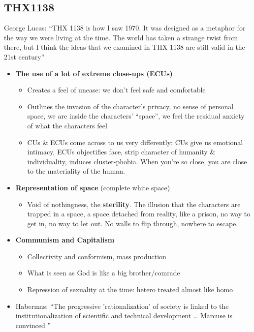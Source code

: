 \documentclass[11pt,fleqn]{book}
\begin{document}
\subsection{THX1138}
George Lucas: \enquote{THX 1138 is how I saw 1970. It was
designed as a metaphor for the
way we were living at the time. The
world has taken a strange twist
from there, but I think the ideas
that we examined in THX 1138 are
still valid in the 21st century}
\begin{itemize}
    \item \textbf{The use of a lot of extreme close-ups (ECUs)}
    \begin{itemize}
        \item Creates a feel of unease: we don't feel safe and comfortable
        \item Outlines the invasion of the character's privacy, no sense of personal space, we are inside the characters' \enquote{space}, we feel the residual anxiety of what the characters feel
        \item CUs \& ECUs come across to us very differently: CUs give us emotional intimacy, ECUs objectifies face, strip character of humanity \& individuality, induces cluster-phobia. When you're so close, you are close to the materiality of the human.
    \end{itemize}
    \item \textbf{Representation of space} (complete white space)
    \begin{itemize}
        \item Void of nothingness, the \textbf{sterility}. The illusion that the characters are trapped in a space, a space detached from reality, like a prison, no way to get in, no way to let out. No walls to flip through, nowhere to escape. 
    \end{itemize}
    \item \textbf{Communism and Capitalism}
    \begin{itemize}
        \item Collectivity and conformism, mass production
        \item What is seen as God is like a big brother/comrade
        \item Repression of sexuality at the time: hetero treated almost like homo
    \end{itemize}
    \item Habermas: \enquote{The progressive 'rationalization' of society is
linked to the institutionalization of scientific and
technical development … Marcuse is convinced
}
\end{itemize}
\end{document}
